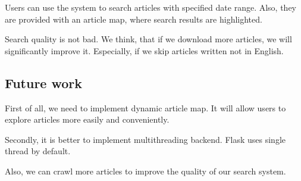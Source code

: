 Users can use the system to search articles with specified date range. Also, they are provided with an article map, where search results are highlighted.

Search quality is not bad. We think, that if we download more articles, we will significantly improve it. Especially, if we skip articles written not in English.

\subsection{Future work}
First of all, we need to implement dynamic article map. It will allow users to explore articles more easily and conveniently.

Secondly, it is better to implement multithreading backend. Flask uses single thread by default. 

Also, we can crawl more articles to improve the quality of our search system.

